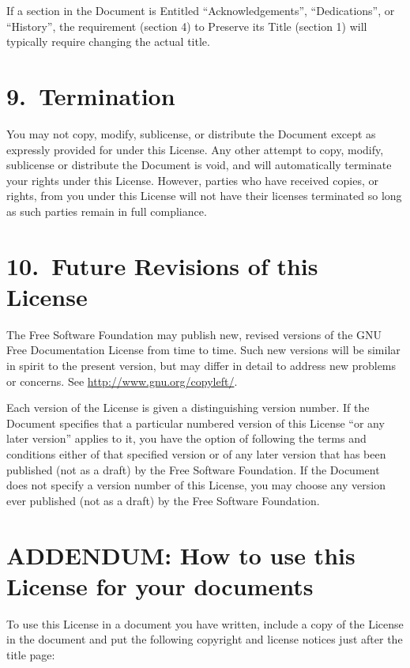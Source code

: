 If a section in the Document is Entitled ``Acknowledgements'',
``Dedications'', or ``History'', the requirement (section 4) to
Preserve its Title (section 1) will typically require changing the
actual title.



\section*{9.\ Termination}

You may not copy, modify, sublicense, or distribute the Document
except as expressly provided for under this License. Any other attempt
to copy, modify, sublicense or distribute the Document is void, and
will automatically terminate your rights under this License. However,
parties who have received copies, or rights, from you under this
License will not have their licenses terminated so long as such
parties remain in full compliance.



\section*{10.\ Future Revisions of this License}

The Free Software Foundation may publish new, revised versions of the
GNU Free Documentation License from time to time. Such new versions
will be similar in spirit to the present version, but may differ in
detail to address new problems or concerns. See
\url{http://www.gnu.org/copyleft/}.

Each version of the License is given a distinguishing version number.
If the Document specifies that a particular numbered version of this
License ``or any later version'' applies to it, you have the option of
following the terms and conditions either of that specified version or
of any later version that has been published (not as a draft) by the
Free Software Foundation. If the Document does not specify a version
number of this License, you may choose any version ever published (not
as a draft) by the Free Software Foundation.



\section*{ADDENDUM: How to use this License for your documents}

To use this License in a document you have written, include a copy of
the License in the document and put the following copyright and
license notices just after the title page:

